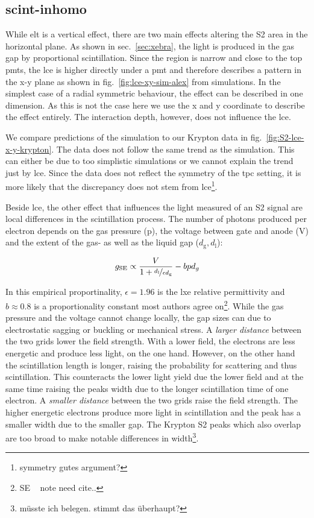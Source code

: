 
\FloatBarrier
\subsection{scint-inhomo}
\label{ssec:scint-inhomo}
\FloatBarrier


While \gls{elt} is a vertical effect, there are two main effects altering the S2 area in the horizontal plane.
As shown in sec.~\ref{sec:xebra}, the light is produced in the gas gap by proportional scintillation.
Since the region is narrow and close to the top \glspl{pmt}, the \gls{lce} is higher directly under a \gls{pmt} and therefore describes a pattern in the x-y plane as shown in fig.~\ref{fig:lce-xy-sim-alex} from simulations.
In the simplest case of a radial symmetric behaviour, the effect can be described in one dimension.
As this is not the case here we use the x and y coordinate to describe the effect entirely.
The interaction depth, however, does not influence the \gls{lce}.

We compare predictions of the simulation to our Krypton data in fig.~\ref{fig:S2-lce-x-y-krypton}.  %
The data does not follow the same trend as the simulation.
This can either be due to too simplistic simulations or we cannot explain the trend just by \gls{lce}.
Since the data does not reflect the symmetry of the \gls{tpc} setting, it is more likely that the discrepancy does not stem from \gls{lce}\footnote{symmetry gutes argument?}.

Beside \gls{lce}, the other effect that influences the light measured of an S2 signal are local differences in the scintillation process.
The number of photons produced per electron depends on the gas pressure (p), the voltage between gate and anode (V) and the extent of the gas- as well as the liquid gap ($ d_\mathrm{g}, d_\mathrm{l}$):

\begin{equation}
    g_\mathrm{SE} \propto \frac{V}{1 + \nicefrac{d_\mathrm{l}}{\epsilon d_\mathrm{g}} }- bpd_g
\end{equation}

In this empirical proportinality, $ \epsilon = 1.96 $ is the \gls{lxe} relative permittivity and $ b \approx 0.8 $ is a proportionality constant most authors agree on\footnote{SE \oneton~ note need cite..}.  %
While the gas pressure and the voltage cannot change locally, the gap sizes can due to electrostatic sagging or buckling or mechanical stress.
A \emph{larger distance} between the two grids lower the field strength.
With a lower field, the electrons are less energetic and produce less light, on the one hand.
However, on the other hand the scintillation length is longer, raising the probability for scattering and thus scintillation.
This counteracts the lower light yield due the lower field and at the same time raising the peaks width due to the longer scintillation time of one electron.
A \emph{smaller distance} between the two grids raise the field strength.
The higher energetic electrons produce more light in scintillation and the peak has a smaller width due to the smaller gap.
The Krypton S2 peaks which also overlap are too broad to make notable differences in width\footnote{müsste ich belegen. stimmt das überhaupt?}.


